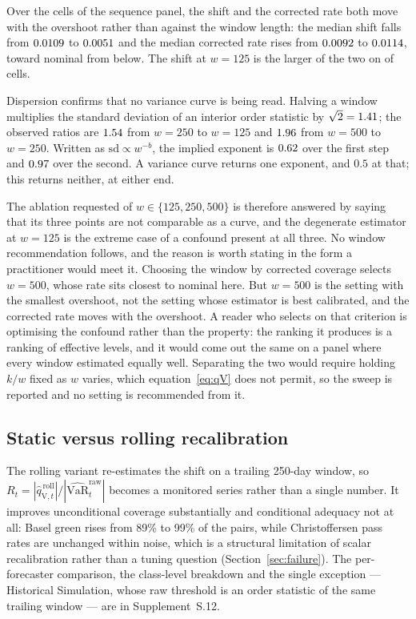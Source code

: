 \documentclass[preprint,11pt,authoryear]{elsarticle}
\newcommand{\VaR}{\mathrm{VaR}}
\newcommand{\1}{\boldsymbol{1}}
\newcommand{\qVroll}{\hat{q}_{{\scriptscriptstyle\mathrm{V}},t}^{\,\mathrm{roll}}}
\begin{document}
Over the \nWSweepCells{} cells of the sequence panel, the shift and the corrected
rate both move with the overshoot rather than against the window length: the
median shift falls from $0.0109$ to $0.0051$ and the
median corrected rate rises from $0.0092$ to $0.0114$, toward
nominal from below. The shift at $w = 125$ is the larger of the two on
\nWSweepShiftLargerShort{} of \nWSweepCells{} cells.

Dispersion confirms that no variance curve is being read. Halving a window
multiplies the standard deviation of an interior order statistic by
$\sqrt 2 = 1.41$; the observed ratios are $1.54$ from
$w = 250$ to $w = 125$ and $1.96$ from $w = 500$ to $w = 250$.
Written as $\mathrm{sd} \propto w^{-b}$, the implied exponent is
$0.62$ over the first step and $0.97$ over the second. A
variance curve returns one exponent, and $0.5$ at that; this returns neither, at
either end.

The ablation requested of $w \in \{125, 250, 500\}$ is therefore answered by
saying that its three points are not comparable as a curve, and the degenerate
estimator at $w = 125$ is the extreme case of a confound present at all three.
No window recommendation follows, and the reason is worth stating in the form a
practitioner would meet it. Choosing the window by corrected coverage selects
$w = 500$, whose rate sits closest to nominal here. But $w = 500$ is the setting
with the smallest overshoot, not the setting whose estimator is best calibrated,
and the corrected rate moves with the overshoot. A reader who selects on that
criterion is optimising the confound rather than the property: the ranking it
produces is a ranking of effective levels, and it would come out the same on a
panel where every window estimated equally well. Separating the two would require
holding $k/w$ fixed as $w$ varies, which equation~\eqref{eq:qV} does not permit,
so the sweep is reported and no setting is recommended from it.

\subsection{Static versus rolling recalibration}
\label{sec:static_vs_rolling}

The rolling variant re-estimates the shift on a trailing 250-day window, so
$R_t = |\qVroll|/|\widehat{\VaR}^{\mathrm{raw}}_t|$ becomes a monitored series
rather than a single number. It improves unconditional coverage substantially and
conditional adequacy not at all: Basel green rises from 89\% to 99\% of the
\nSeqPairs{} pairs, while Christoffersen pass rates are unchanged within noise,
which is a structural limitation of scalar recalibration rather than a tuning
question (Section~\ref{sec:failure}). The per-forecaster comparison, the
class-level breakdown and the single exception --- Historical Simulation, whose
raw threshold is an order statistic of the same trailing window --- are in
Supplement~S.12.
\end{document}
